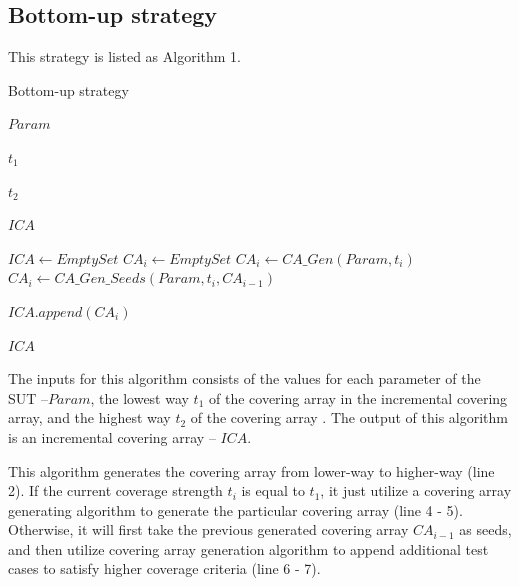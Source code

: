 \documentclass[conference]{IEEEtran}
\theoremstyle{definition}
\begin{document}
\subsection{Bottom-up strategy}
This strategy is listed as Algorithm 1.
\begin{algorithm}
  \caption{Bottom-up strategy}
  \begin{algorithmic}[1]
     \Require
     $Param$ 

     $t_{1}$ 

     $t_{2}$ 

     \Ensure  $ICA$ 

      \State $ICA \leftarrow Empty Set$
         \State $CA_{i} \leftarrow  Empty Set $
                \State $CA_{i} \leftarrow CA\_Gen(Param, t_{i})$
         \Else
             \State $CA_{i} \leftarrow CA\_Gen\_Seeds(Param, t_{i}, CA_{i - 1})$
        \EndIf

        \State $ICA.append(CA_{i})$
      \EndFor

     \State \Return $ICA$
  \end{algorithmic}
\end{algorithm}
The inputs for this algorithm consists of the values for each parameter of the SUT --$Param$,  the lowest way $t_{1}$ of the covering array in the incremental covering array, and the highest way $t_{2}$ of the covering array . The output of this algorithm is an incremental covering array -- $ICA$.

This algorithm generates the covering array from lower-way to higher-way (line 2). If the current coverage strength $t_{i}$ is equal to $t_{1}$, it just utilize a covering array generating algorithm to generate the particular covering array (line 4 - 5). Otherwise, it will first take the previous generated covering array $CA_{i - 1}$ as seeds, and then utilize covering array generation algorithm to append additional test cases to satisfy higher coverage criteria (line 6 - 7).
%
\end{document}
